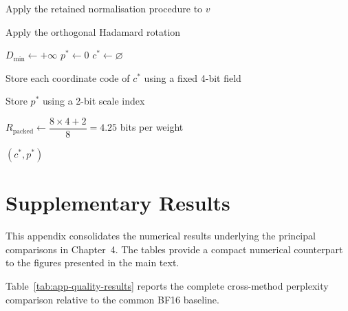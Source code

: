 \begin{algorithm}[htbp]
\caption{NestQuant vector quantization and W4.25 packing}
\label{alg:nestquant-packing}



Apply the retained normalisation procedure to $v$\;

Apply the orthogonal Hadamard rotation\;

$D_{\min} \leftarrow +\infty$\;
$p^{*} \leftarrow 0$\;
$c^{*} \leftarrow \varnothing$\;


Store each coordinate code of $c^{*}$ using a fixed 4-bit field\;

Store $p^{*}$ using a 2-bit scale index\;

$R_{\mathrm{packed}}
\leftarrow
\dfrac{8\times4+2}{8}
=
4.25$ bits per weight\;

\Return $(c^{*},p^{*})$\;

\end{algorithm}




\chapter{Supplementary Results}
\label{app:supplementary-results}

This appendix consolidates the numerical results underlying the
principal comparisons in Chapter~4. The tables provide a compact
numerical counterpart to the figures presented in the main text.

Table~\ref{tab:app-quality-results} reports the complete cross-method
perplexity comparison relative to the common BF16 baseline.

